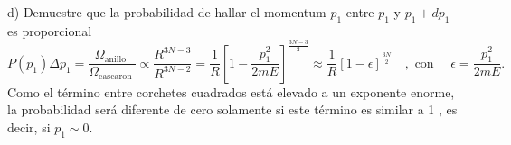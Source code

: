 d) Demuestre que la probabilidad de hallar el momentum $p_1$ entre $p_1$ y $p_1+d p_1$ es proporcional
$$
P\left(p_1\right) \Delta p_1=\frac{\Omega_{\text {anillo }}}{\Omega_{\text {cascaron }}} \propto \frac{R^{3 N-3}}{R^{3 N-2}}=\frac{1}{R}\left[1-\frac{p_1^2}{2 m E}\right]^{\frac{3 N-3}{2}} \approx \frac{1}{R}[1-\epsilon]^{\frac{3 N}{2}} \quad, \text { con } \quad \epsilon=\frac{p_1^2}{2 m E} .
$$
Como el término entre corchetes cuadrados está elevado a un exponente enorme, la probabilidad será diferente de cero solamente si este término es similar a 1 , es decir, si $p_1 \sim 0$.